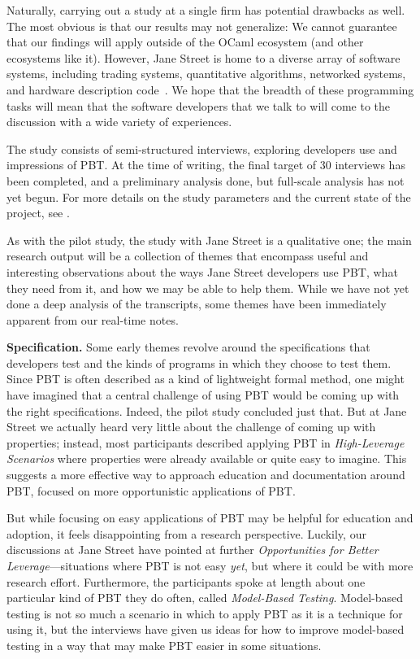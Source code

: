 Naturally, carrying out a study at a single firm has potential drawbacks as
well. The most obvious is that our results may not generalize: We
cannot guarantee that our findings will apply outside of the OCaml ecosystem (and
other ecosystems like it). However, Jane Street is home to a diverse array of
software systems, including trading systems, quantitative
algorithms, networked systems, and hardware description code~\cite{signalsandthreads}.
We hope that the breadth of these programming tasks will mean that the software
developers that we talk to will come to the discussion with a wide variety of
experiences.

The study consists of semi-structured interviews, exploring developers use and
impressions of PBT. At the time of writing, the final target of 30 interviews
has been completed, and a preliminary analysis done, but full-scale analysis has
not yet begun. For more details on the study parameters and the current state of
the project, see .

As with the pilot study, the study with Jane Street is a
qualitative one; the main research output will be a collection of themes that
encompass useful and interesting observations about the ways Jane Street
developers use PBT, what they need from it, and how we may be able to help them.
While we have not yet done a deep analysis of the transcripts, some themes have
been immediately apparent from our real-time notes.

\newcommand{\proptheme}[1]{{\color{nord-orange} \em #1}}
\newcommand{\gentheme}[1]{{\color{nord-green} \em #1}}
\newcommand{\evaltheme}[1]{{\color{nord-purple} \em #1}}
{\bf Specification.} Some early themes revolve around the specifications that
developers test and the kinds of programs in which they choose to test them.
Since PBT is often described as a kind of lightweight formal method, one might
have imagined that a central challenge of using PBT would be coming up with the
right specifications. Indeed, the pilot study concluded just
that. But at Jane Street we actually heard very little about the challenge of
coming up with properties; instead, most participants described applying PBT in
\proptheme{High-Leverage Scenarios} where properties were already available or
quite easy to imagine. This suggests a more effective way to approach education
and documentation around PBT, focused on more opportunistic applications of PBT.

But while focusing on easy applications of PBT may be helpful for education and
adoption, it feels disappointing from a research perspective. Luckily, our
discussions at Jane Street have pointed at further \proptheme{Opportunities for
Better Leverage}---situations where PBT is not easy {\em yet}, but where it
could be with more research effort. Furthermore, the participants spoke at
length about one particular kind of PBT they do often, called
\proptheme{Model-Based Testing}. Model-based testing is not so much a scenario in
which to apply PBT as it is a technique for using it, but the interviews have
given us ideas for how to improve model-based testing in a way that may make PBT
easier in some situations.

